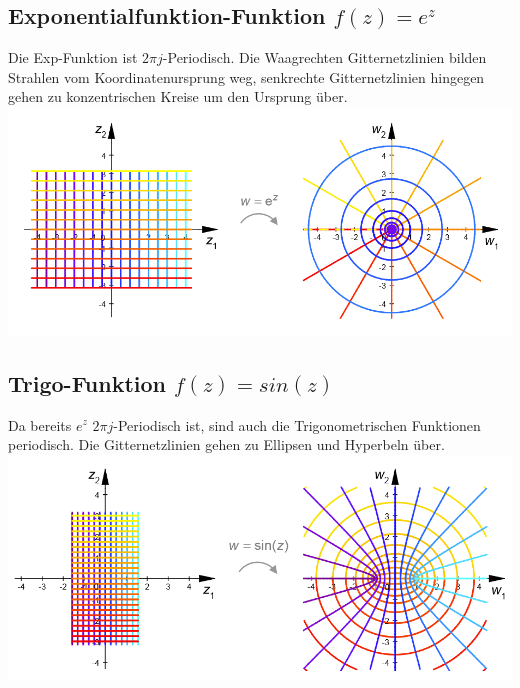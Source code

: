 \subsection{Exponentialfunktion-Funktion $f(z) = e^z$}
Die Exp-Funktion ist $2\pi j$-Periodisch. Die Waagrechten Gitternetzlinien bilden Strahlen vom Koordinatenursprung weg, senkrechte Gitternetzlinien hingegen gehen zu konzentrischen Kreise um den Ursprung über.\\
\includegraphics[width=\columnwidth]{Images/exp_funktion}


\subsection{Trigo-Funktion $f(z) = sin(z)$}
Da bereits $e^z$ $2\pi j$-Periodisch ist, sind auch die Trigonometrischen Funktionen periodisch. Die Gitternetzlinien gehen zu Ellipsen und Hyperbeln über.
\includegraphics[width=\columnwidth]{Images/sinus_funktion}